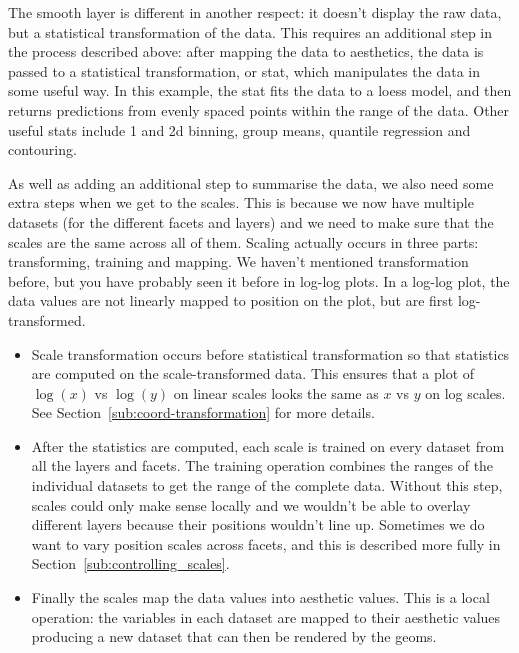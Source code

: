 The smooth layer is different in another respect: it doesn't display the raw data, but a statistical transformation of the data.  This requires an additional step in the process described above: after mapping the data to aesthetics, the data is passed to a statistical transformation, or stat, which manipulates the data in some useful way.  In this example, the stat fits the data to a loess model, and then returns predictions from evenly spaced points within the range of the data.  Other useful stats include 1 and 2d binning, group means, quantile regression and contouring.

% 


As well as adding an additional step to summarise the data, we also need some extra steps when we get to the scales.  This is because we now have multiple datasets (for the different facets and layers) and we need to make sure that the scales are the same across all of them.  Scaling actually occurs in three parts: transforming, training and mapping.  We haven't mentioned transformation before, but you have probably seen it before in log-log plots.  In a log-log plot, the data values are not linearly mapped to position on the plot, but are first log-transformed.  

\begin{itemize}
  \item Scale transformation occurs before statistical transformation so that statistics are computed on the scale-transformed data.  This ensures that a plot of $\log(x)$ vs $\log(y)$ on linear scales looks the same as $x$ vs $y$ on log scales.  See Section~\ref{sub:coord-transformation} for more details. 
  
  \item After the statistics are computed, each scale is trained on every dataset from all the layers and facets.  The training operation combines the ranges of the individual datasets to get the range of the complete data.  Without this step, scales could only make sense locally and we wouldn't be able to overlay different layers because their positions wouldn't line up.  Sometimes we do want to vary position scales across facets, and this is described more fully in Section~\ref{sub:controlling_scales}.
  
  \item Finally the scales map the data values into aesthetic values.  This is a local operation: the variables in each dataset are mapped to their aesthetic values producing a new dataset that can then be rendered by the geoms.
  
\end{itemize}

